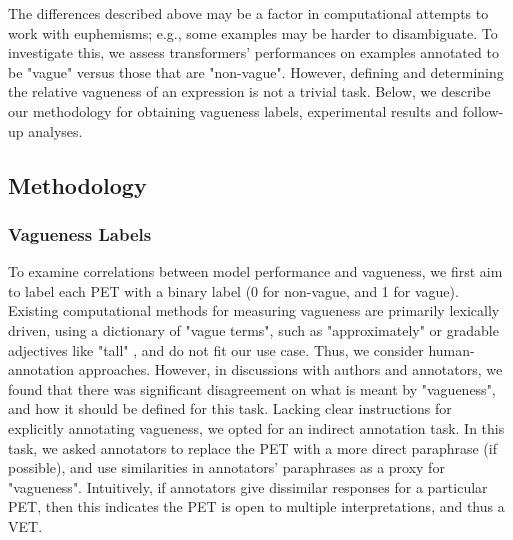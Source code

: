 \documentclass[11pt]{article}
\begin{document}
The differences described above may be a factor in computational attempts to work with euphemisms; e.g., some examples may be harder to disambiguate. To investigate this, we assess transformers' performances on examples annotated to be "vague" versus those that are "non-vague". However, defining and determining the relative vagueness of an expression is not a trivial task. Below, we describe our methodology for obtaining vagueness labels, experimental results and follow-up analyses.

\subsection{Methodology}

\subsubsection{Vagueness Labels}
To examine correlations between model performance and vagueness, we first aim to label each PET with a binary label (0 for non-vague, and 1 for vague). Existing computational methods for measuring vagueness are primarily lexically driven, using a dictionary of "vague terms", such as "approximately" or gradable adjectives like "tall" \cite{guelorget:21, lebanoff18}, and do not fit our use case. Thus, we consider human-annotation approaches.  However, in discussions with authors and annotators, we found that there was significant disagreement on what is meant by "vagueness", and how it should be defined for this task. Lacking clear instructions for explicitly annotating vagueness, we opted for an indirect annotation task. In this task, we asked annotators to replace the PET with a more direct paraphrase (if possible), and use similarities in annotators' paraphrases as a proxy for "vagueness". Intuitively, if annotators give dissimilar responses for a particular PET, then this indicates the PET is open to multiple interpretations, and thus a VET.
\end{document}
